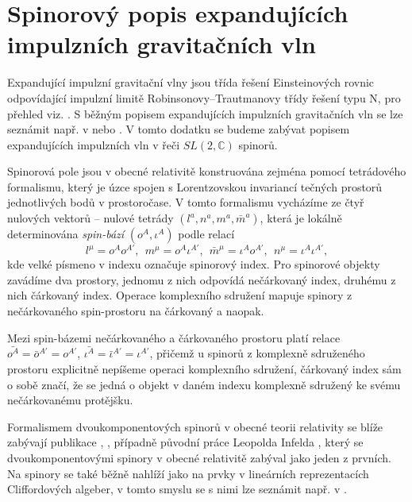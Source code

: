 \chapter{Spinorový popis expandujících impulzních gravitačních vln}
\label{chap:kap04}
Expandující impulzní gravitační vlny jsou třída řešení Einsteinových rovnic odpovídající impulzní limitě
Robinsonovy--Trautmanovy třídy řešení typu N, pro přehled viz. \cite{griffiths_podolsky_2009}. S běžným popisem expandujících impulzních gravitačních vln se lze seznámit např. v
\cite{Podolsky:2016mqg} nebo \cite{Podolsky_1999}. V tomto dodatku se budeme zabývat
popisem expandujících impulzních vln v řeči $SL(2, \mathbb{C})$ spinorů.

Spinorová pole jsou v obecné relativitě konstruována zejména pomocí tetrádového formalismu,
který je úzce spojen s Lorentzovskou invariancí tečných prostorů jednotlivých bodů v prostoročase.
V tomto formalismu vycházíme ze čtyř nulových vektorů -- nulové tetrády $(l^a, n^a, m^a, \bar{m}^a)$,
která je lokálně determinována \emph{spin-bází} $(o^A, \iota^A)$ podle relací
\begin{equation}
    \label{eq:tetrad-spinor-basis-relation}
    l^\mu = o^A o^{A'}, ~~ m^\mu = o^A \iota^{A'}, ~~ \bar{m}^\mu = \iota^A o^{A'}, ~~ n^\mu = \iota^A \iota^{A'},
\end{equation}
kde velké písmeno v indexu označuje spinorový index. Pro spinorové objekty zavádíme dva prostory,
jednomu z nich odpovídá nečárkovaný index, druhému z nich čárkovaný index. Operace komplexního sdružení
mapuje spinory z nečárkovaného spin-prostoru na čárkovaný a naopak.

Mezi spin-bázemi nečárkovaného a čárkovaného prostoru platí relace $\bar{o^A} = \bar{o}^{A'} = o^{A'}$, $\bar{\iota^A} = \bar{\iota}^{A'} = \iota^{A'}$, přičemž
u spinorů z komplexně sdruženého prostoru explicitně nepíšeme operaci komplexního sdružení, čárkovaný index sám o sobě značí,
že se jedná o objekt v daném indexu komplexně sdružený ke svému nečárkovanému protějšku.

Formalismem dvoukomponentových spinorů v obecné teorii relativity se blíže zabývají publikace
\cite{penrose_rindler_1984}, \cite{doi:10.1142/5222}, případně původní práce Leopolda Infelda \cite{zbMATH03005509},
který se dvoukomponentovými spinory v obecné relativitě zabýval jako jeden z prvních. Na spinory se také běžně
nahlíží jako na prvky v lineárních reprezentacích Cliffordových algeber, v tomto smyslu se s nimi lze seznámit např. v \cite{fecko_2006}.

